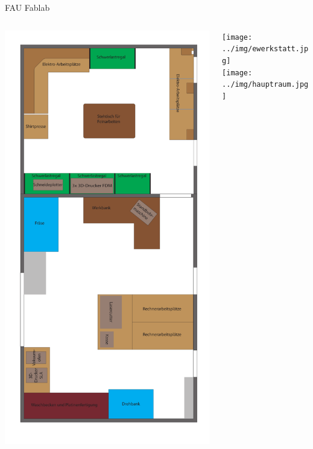 \documentclass[t]{beamer}
\begin{document}
\begin{frame}{FAU Fablab}
    \begin{columns}
        \begin{column}[T]{0.25\textwidth}
            \includegraphics[height=0.9\textheight]{../img/fablabplan.pdf}
        \end{column}
        \begin{column}[T]{0.7\textwidth}
            \texttt{[image: ../img/ewerkstatt.jpg]}\\
            \texttt{[image: ../img/hauptraum.jpg]}
        \end{column}
    \end{columns}
\end{frame}
\end{document}
